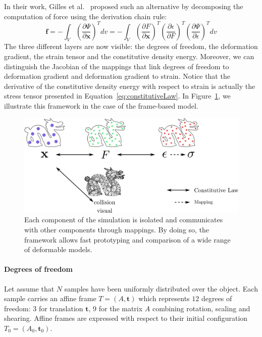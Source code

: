 In their work, Gilles et al.~\cite{Gilles2011} proposed such an alternative by decomposing the computation of force using the derivation chain rule:
\begin{equation}
\label{eq:forceChainRule}
\displaystyle \mathbf{f} = -\int_{V} \left(\frac{\partial \Psi}{\partial \mathbf{x}}\right)^{T} dv
=
-\int_{V} \left(\frac{\partial F}{\partial \mathbf{x}}\right)^{T}
\left(\frac{\partial \epsilon}{\partial F}\right)^{T}
\left(\frac{\partial \Psi}{\partial \epsilon}\right)^{T} dv
\end{equation}
The three different layers are now visible: the degrees of freedom, the deformation gradient, the strain tensor and the constitutive density energy.
Moreover, we can distinguish the Jacobian of the mappings that link degrees of freedom to deformation gradient and deformation gradient to strain.
Notice that the derivative of the constitutive density energy with respect to strain is actually the stress tensor presented in Equation~\eqref{eq:constitutiveLaw}.
In Figure~\ref{fig:multiLayerFramework}, we illustrate this framework in the case of the frame-based model.
\begin{figure}[H]
\centering
\includegraphics[width=\linewidth]{./images/continuum_mechanics/multiLayeredFramework.png}
\caption[STAR mechanics: Multi-layer framework]{\label{fig:multiLayerFramework} Each component of the simulation is isolated and communicates with other components through mappings. By doing so, the framework allows fast prototyping and comparison of a wide range of deformable models.}
\end{figure}

\paragraph{Degrees of freedom} Let assume that $N$ samples have been uniformly distributed over the object. 
Each sample carries an affine frame $T=(A,\mathbf{t})$ which represents $12$ degrees of freedom: $3$ for translation $\mathbf{t}$, $9$ for the matrix $A$ combining rotation, scaling and shearing. 
Affine frames are expressed with respect to their initial configuration~$T_{0} = \left(A_{0}, \mathbf{t}_{0}\right)$.

